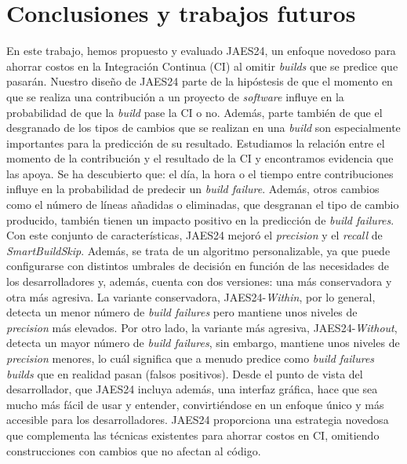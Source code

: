 \section{Conclusiones y trabajos futuros}
En este trabajo, hemos propuesto y evaluado JAES24, un enfoque novedoso para ahorrar
costos en la Integración Continua (CI) al omitir \textit{builds} que se predice que pasarán.
Nuestro diseño de JAES24 parte de la hipóstesis de que el momento en que se realiza una
contribución a un proyecto de \textit{software} influye en la probabilidad de que la \textit{build}
pase la CI o no. Además, parte también de que el desgranado de los tipos de cambios que se
realizan en una \textit{build} son especialmente importantes para la predicción de su resultado.
Estudiamos la relación entre el momento de la contribución y el resultado de la CI y encontramos
evidencia que las apoya. Se ha descubierto que: el día, la hora o el tiempo entre contribuciones
influye en la probabilidad de predecir un \textit{build failure}. Además, otros cambios como el
número de líneas añadidas o eliminadas, que desgranan el tipo de cambio producido, también tienen
un impacto positivo en la predicción de \textit{build failures}.\\

Con este conjunto de características, JAES24 mejoró el \textit{precision} y el
\textit{recall} de \textit{SmartBuildSkip}. Además, se trata de un algoritmo personalizable, ya
que puede configurarse con distintos umbrales de decisión en función de las necesidades de los
desarrolladores y, además, cuenta con dos versiones: una más conservadora y otra más agresiva.
La variante conservadora, JAES24-\textit{Within}, por lo general, detecta un menor número de
\textit{build failures} pero mantiene unos niveles de \textit{precision} más elevados. Por otro
lado, la variante más agresiva, JAES24-\textit{Without}, detecta un mayor número de \textit{build
failures}, sin embargo, mantiene unos niveles de \textit{precision} menores, lo cuál significa que
a menudo predice como \textit{build failures} \textit{builds} que en realidad pasan (falsos positivos). Desde
el punto de vista del desarrollador, que JAES24 incluya además, una interfaz gráfica, hace
que sea mucho más fácil de usar y entender, convirtiéndose en un enfoque único y más accesible
para los desarrolladores. JAES24 proporciona una estrategia novedosa que complementa las
técnicas existentes para ahorrar costos en CI, omitiendo construcciones con cambios que no afectan
al código.\\

